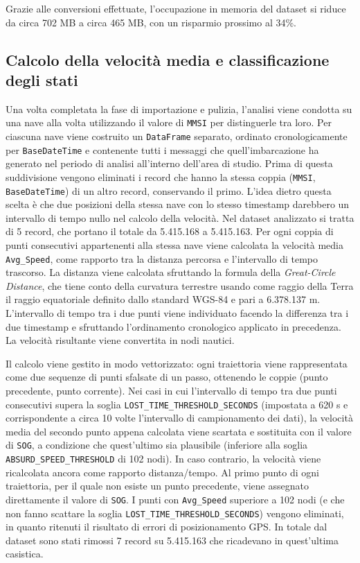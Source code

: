 Grazie alle conversioni effettuate, l'occupazione in memoria del dataset si riduce da
circa 702 MB a circa 465 MB, con un risparmio prossimo al 34\%.

\subsection{Calcolo della velocità media e classificazione degli stati}\label{ssec:meth_status}
 
Una volta completata la fase di importazione e pulizia, l'analisi viene condotta su una nave alla volta utilizzando
il valore di \texttt{MMSI} per distinguerle tra loro.
Per ciascuna nave viene costruito un \texttt{DataFrame} separato, ordinato cronologicamente per \texttt{BaseDateTime} e contenente
tutti i messaggi che quell'imbarcazione ha generato nel periodo di analisi all'interno dell'area di studio.
Prima di questa suddivisione vengono eliminati i record che hanno la stessa coppia
(\texttt{MMSI}, \texttt{BaseDateTime}) di un altro record, conservando il primo. L'idea dietro questa scelta è che due posizioni
della stessa nave con lo stesso timestamp darebbero un intervallo di tempo nullo nel calcolo
della velocità. Nel dataset analizzato si tratta di 5 record, che portano il totale da
5.415.168 a 5.415.163.
Per ogni coppia di punti consecutivi appartenenti alla stessa nave viene calcolata la velocità media \texttt{Avg\_Speed},
come rapporto tra la distanza percorsa e l'intervallo di tempo trascorso. La distanza viene calcolata sfruttando la formula
della \emph{Great-Circle Distance}, che tiene conto della curvatura terrestre usando come raggio della Terra il raggio equatoriale definito
dallo standard WGS-84 e pari a 6.378.137 m. L'intervallo di tempo tra i due punti
viene individuato facendo la differenza tra i due timestamp e sfruttando l'ordinamento cronologico applicato in precedenza. 
La velocità risultante viene convertita in nodi nautici.
 
Il calcolo viene gestito in modo vettorizzato: ogni traiettoria viene rappresentata come due sequenze di punti sfalsate
di un passo, ottenendo le coppie (punto precedente, punto corrente). Nei casi in cui l'intervallo di tempo
tra due punti consecutivi supera la soglia \texttt{LOST\_TIME\_THRESHOLD\_SECONDS} (impostata a 620 s e corrispondente
a circa 10 volte l'intervallo di campionamento dei dati), la velocità media del secondo punto appena calcolata
viene scartata e sostituita con il valore di \texttt{SOG}, a condizione che quest'ultimo sia plausibile (inferiore
alla soglia \texttt{ABSURD\_SPEED\_THRESHOLD} di 102 nodi). In caso contrario, la velocità viene ricalcolata
ancora come rapporto distanza/tempo. Al primo punto di ogni traiettoria, per il quale non esiste un punto
precedente, viene assegnato direttamente il valore di \texttt{SOG}. I punti con \texttt{Avg\_Speed} superiore
a 102 nodi (e che non fanno scattare la soglia \texttt{LOST\_TIME\_THRESHOLD\_SECONDS}) vengono eliminati, 
in quanto ritenuti il risultato di errori di posizionamento GPS\@. In totale dal dataset sono stati rimossi 7 record
su 5.415.163 che ricadevano in quest'ultima casistica. 
 
